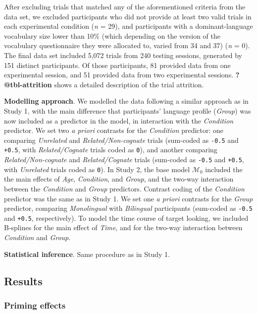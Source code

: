 \documentclass[
  12pt,
  b5paperpaper,
  twoside]{scrreprt}
\begin{document}
After excluding trials that matched any of the aforementioned criteria
from the data set, we excluded participants who did not provide at least
two valid trials in each experimental condition (\emph{n} = 29), and
participants with a dominant-language vocabulary size lower than 10\%
(which depending on the version of the vocabulary questionnaire they
were allocated to, varied from 34 and 37) (\emph{n} = 0). The final data
set included 5,072 trials from 240 testing sessions, generated by 151
distinct participants. Of those participants, 81 provided data from one
experimental session, and 51 provided data from two experimental
sessions. \textbf{?@tbl-attrition} shows a detailed description of the
trial attrition.

\textbf{Modelling approach}. We modelled the data following a similar
approach as in Study 1, with the main difference that participants'
language profile (\emph{Group}) was now included as a predictor in the
model, in interaction with the \emph{Condition} predictor. We set two
\emph{a priori} contrasts for the \emph{Condition} predictor: one
comparing \emph{Unrelated} and \emph{Related/Non-cognate} trials
(sum-coded as \texttt{-0.5} and \texttt{+0.5}, with
\emph{Related/Cognate} trials coded as \texttt{0}), and another
comparing \emph{Related/Non-cognate} and \emph{Related/Cognate} trials
(sum-coded as \texttt{-0.5} and \texttt{+0.5}, with \emph{Unrelated}
trials coded as \texttt{0}). In Study 2, the base model
\(\mathcal{M}_0\) included the the main effects of \emph{Age},
\emph{Condition}, and \emph{Group}, and the two-way interaction between
the \emph{Condition} and \emph{Group} predictors. Contrast coding of the
\emph{Condition} predictor was the same as in Study 1. We set one
\emph{a priori} contrasts for the \emph{Group} predictor, comparing
\emph{Monolingual} with \emph{Bilingual} participants (sum-coded as
\texttt{-0.5} and \texttt{+0.5}, respectively). To model the time course
of target looking, we included B-splines for the main effect of
\emph{Time}, and for the two-way interaction between \emph{Condition}
and \emph{Group}.

\textbf{Statistical inference}. Same procedure as in Study 1.

\hypertarget{results-1}{%
\subsection{Results}\label{results-1}}

\hypertarget{priming-effects-1}{%
\subsubsection{Priming effects}\label{priming-effects-1}}
\end{document}
